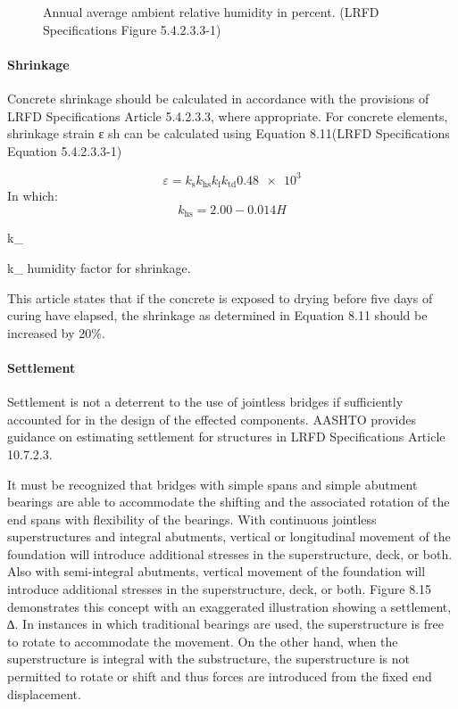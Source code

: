 \begin{figure}
  \caption{Annual average ambient relative humidity in percent. (LRFD Specifications Figure 5.4.2.3.3-1)}
  \label{fig:annual-average-humidity}
\end{figure}

\paragraph{Shrinkage}

Concrete shrinkage should be calculated in accordance with the provisions of LRFD Specifications Article
5.4.2.3.3, where appropriate. For concrete elements, shrinkage strain ε sh can be calculated using Equation 8.11(LRFD
Specifications Equation 5.4.2.3.3-1)

\begin{equation}
  \varepsilon = k_\text{s} k_\text{hs} k_\text{f} k_\text{td}\num{0.48e3}
\end{equation}
In which:
\begin{equation}
  k_\text{hs}= 2.00-0.014H
\end{equation}
\begin{EqDesc}{k_}
  \item[k_\text{hs}] humidity factor for shrinkage.
\end{EqDesc}

This article states that if the concrete is exposed to drying before five days of curing have elapsed, the shrinkage
as determined in Equation 8.11 should be increased by 20\%.


\paragraph{Settlement}
Settlement is not a deterrent to the use of jointless bridges if sufficiently accounted for in the design of the
effected components. AASHTO provides guidance on estimating settlement for structures in LRFD Specifications
Article 10.7.2.3.

It must be recognized that bridges with simple spans and simple abutment bearings are able to accommodate the
shifting and the associated rotation of the end spans with flexibility of the bearings. With continuous jointless
superstructures and integral abutments, vertical or longitudinal movement of the foundation will introduce additional
stresses in the superstructure, deck, or both. Also with semi-integral abutments, vertical movement of the foundation
will introduce additional stresses in the superstructure, deck, or both. Figure 8.15 demonstrates this concept with an
exaggerated illustration showing a settlement, ∆.
 In instances in which traditional bearings are used, the
superstructure is free to rotate to accommodate the movement. On the other hand, when the superstructure is integral
with the substructure, the superstructure is not permitted to rotate or shift and thus forces are introduced from the
fixed end displacement.

